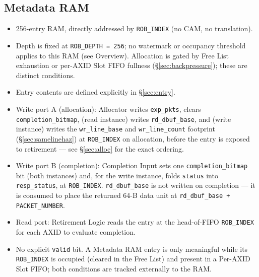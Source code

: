 \subsection{Metadata RAM}
\label{sec:ram}
\begin{itemize}[noitemsep]
  \item 256-entry RAM, directly addressed by \texttt{ROB\_INDEX} (no CAM, no translation).
  \item Depth is fixed at \texttt{ROB\_DEPTH = 256}; no watermark or occupancy threshold applies to this RAM (see Overview). Allocation is gated by Free List exhaustion or per-AXID Slot FIFO fullness (\S\ref{sec:backpressure}); these are distinct conditions.
  \item Entry contents are defined explicitly in \S\ref{sec:entry}.
  \item Write port A (allocation): Allocator writes \texttt{exp\_pkts}, clears \texttt{completion\_bitmap}, (read instance) writes \texttt{rd\_dbuf\_base}, and (write instance) writes the \texttt{wr\_line\_base} and \texttt{wr\_line\_count} footprint (\S\ref{sec:samelinehaz}) at \texttt{ROB\_INDEX} on allocation, before the entry is exposed to retirement --- see \S\ref{sec:alloc} for the exact ordering.
  \item Write port B (completion): Completion Input sets one \texttt{completion\_bitmap} bit (both instances) and, for the write instance, folds \texttt{status} into \texttt{resp\_status}, at \texttt{ROB\_INDEX}. \texttt{rd\_dbuf\_base} is not written on completion --- it is consumed to place the returned 64-B data unit at \texttt{rd\_dbuf\_base + PACKET\_NUMBER}.
  \item Read port: Retirement Logic reads the entry at the head-of-FIFO \texttt{ROB\_INDEX} for each AXID to evaluate completion.
  \item No explicit \texttt{valid} bit. A Metadata RAM entry is only meaningful while its \texttt{ROB\_INDEX} is occupied (cleared in the Free List) and present in a Per-AXID Slot FIFO; both conditions are tracked externally to the RAM.
\end{itemize}

